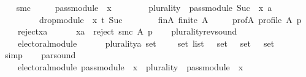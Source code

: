 \begin{isabellebody}
\ \ \isamarkupfalse%
\ {\isacharquery}{\kern0pt}smc\ {\isacharequal}{\kern0pt}\isanewline
\ \ \ \ {\isachardoublequoteopen}pass{\isacharunderscore}{\kern0pt}module\ {}\ x\ {\isasymtriangleright}\isanewline
\ \ \ \ \ \ \ {\isacharparenleft}{\kern0pt}{\isacharparenleft}{\kern0pt}plurality{\isasymdown}{\isacharparenright}{\kern0pt}\ {\isasymtriangleright}\ pass{\isacharunderscore}{\kern0pt}module\ {\isacharparenleft}{\kern0pt}Suc\ {}{\isacharparenright}{\kern0pt}\ x{\isacharparenright}{\kern0pt}\ {\isasymparallel}\isactrlsub {\isacharquery}{\kern0pt}a\isanewline
\ \ \ \ \ \ \ \ \ drop{\isacharunderscore}{\kern0pt}module\ {}\ x\ {\isasymcirclearrowleft}\isactrlsub {\isacharquery}{\kern0pt}t\ {\isacharparenleft}{\kern0pt}Suc\ {}{\isacharparenright}{\kern0pt}{\isachardoublequoteclose}\isanewline
\ \ \isamarkupfalse%
\isanewline
\ \ \ \ fin{\isacharunderscore}{\kern0pt}A{\isacharcolon}{\kern0pt}\ {\isachardoublequoteopen}finite\ A{\isachardoublequoteclose}\ \isanewline
\ \ \ \ prof{\isacharunderscore}{\kern0pt}A{\isacharcolon}{\kern0pt}\ {\isachardoublequoteopen}profile\ A\ p{\isachardoublequoteclose}\ \isanewline
\ \ \ \ reject{\isacharunderscore}{\kern0pt}xa{\isacharcolon}{\kern0pt}\isanewline
\ \ \ \ \ \ {\isachardoublequoteopen}xa\ {\isasymin}\ reject\ {\isacharparenleft}{\kern0pt}{\isacharquery}{\kern0pt}smc{\isacharparenright}{\kern0pt}\ A\ p{\isachardoublequoteclose}\isanewline
\ \ \isamarkupfalse%
\ plurality{\isacharunderscore}{\kern0pt}rev{\isacharunderscore}{\kern0pt}sound{\isacharcolon}{\kern0pt}\isanewline
\ \ \ \ {\isachardoublequoteopen}electoral{\isacharunderscore}{\kern0pt}module\isanewline
\ \ \ \ \ \ {\isacharparenleft}{\kern0pt}plurality{\isacharcolon}{\kern0pt}{\isacharcolon}{\kern0pt}{\isacharprime}{\kern0pt}a\ set\ {\isasymRightarrow}\ {\isacharparenleft}{\kern0pt}{\isacharunderscore}{\kern0pt}\ {\isasymtimes}\ {\isacharunderscore}{\kern0pt}{\isacharparenright}{\kern0pt}\ set\ list\ {\isasymRightarrow}\ {\isacharunderscore}{\kern0pt}\ set\ {\isasymtimes}\ {\isacharunderscore}{\kern0pt}\ set\ {\isasymtimes}\ {\isacharunderscore}{\kern0pt}\ set{\isasymdown}{\isacharparenright}{\kern0pt}{\isachardoublequoteclose}\isanewline
\ \ \ \ \isamarkupfalse%
\ simp\isanewline
\ \ \isamarkupfalse%
\ par{}{\isacharunderscore}{\kern0pt}sound{\isacharcolon}{\kern0pt}\isanewline
\ \ \ \ {\isachardoublequoteopen}electoral{\isacharunderscore}{\kern0pt}module\ {\isacharparenleft}{\kern0pt}pass{\isacharunderscore}{\kern0pt}module\ {}\ x\ {\isasymtriangleright}\ {\isacharparenleft}{\kern0pt}{\isacharparenleft}{\kern0pt}plurality{\isasymdown}{\isacharparenright}{\kern0pt}\ {\isasymtriangleright}\ pass{\isacharunderscore}{\kern0pt}module\ {}\ x{\isacharparenright}{\kern0pt}{\isacharparenright}{\kern0pt}{\isachardoublequoteclose}\isanewline

\end{isabellebody}
